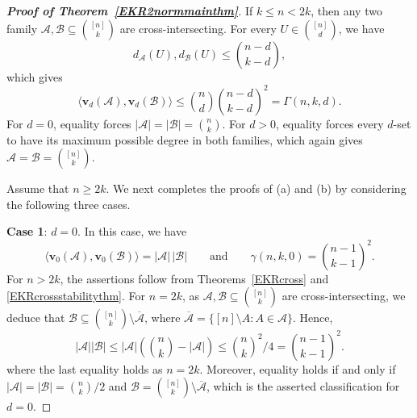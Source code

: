 \documentclass[10pt,a4paper]{amsart}
\numberwithin{equation}{section}
\def\A{\mathcal{A}}
\def\B{\mathcal{B}}
\begin{document}
\begin{proof}[{\bf Proof of Theorem~\ref{EKR2normmainthm}}]
If $k\leq n<2k$,
then any two family $\A,\B\subseteq \binom{[n]}{k}$ are cross-intersecting.
For every
$U\in\binom{[n]}d$, we have
\[
d_{\mathcal A}(U),d_{\mathcal B}(U)
\leq\binom{n-d}{k-d},
\]
which gives
\[
\big\langle\mathbf v_d(\mathcal A),\mathbf v_d(\mathcal B)\big\rangle
\leq\binom nd\binom{n-d}{k-d}^{2}=\Gamma(n,k,d).
\]
For $d=0$, equality forces $|\mathcal A|=|\mathcal B|=\binom nk$.
For $d>0$, equality forces every $d$-set to have its maximum possible degree in both families, which again gives
$\mathcal A=\mathcal B=\binom{[n]}k$.



Assume that $n\geq2k$.
We next completes the proofs of (a) and (b) by considering the following three cases.

{\bf Case 1}: $d=0$.
In this case, we have
\[
\big\langle\mathbf{v}_0(\mathcal{A}),
\mathbf{v}_0(\mathcal{B})\big\rangle
=|\mathcal{A}|\,|\mathcal{B}|
\qquad\text{and}\qquad
\gamma(n,k,0)=\binom{n-1}{k-1}^2.
\]
For $n>2k$, the assertions follow from Theorems~\ref{EKRcross} and
\ref{EKRcrossstabilitythm}.
For $n=2k$, as $\A,\B\subseteq \binom{[n]}{k}$ are cross-intersecting, we deduce that $\mathcal B\subseteq\binom{[n]}k\setminus\overline{\mathcal A}$, where $\overline{\mathcal A}=\{[n]\setminus A:A\in\mathcal A\}$.
Hence,
\[
|\mathcal A||\mathcal B|\leq |\A|(\binom{n}{k}-|\A|)
\leq \binom{n}{k}^2/4=\binom{n-1}{k-1}^2.
\]
where the last equality holds as $n=2k$.
Moreover, equality holds if and only if $|\mathcal A|=|\mathcal B|=\binom{n}{k}/2$ and
$\mathcal B=\binom{[n]}k\setminus\overline{\mathcal A}$, which is
the asserted classification for $d=0$.


\end{proof}
\end{document}
